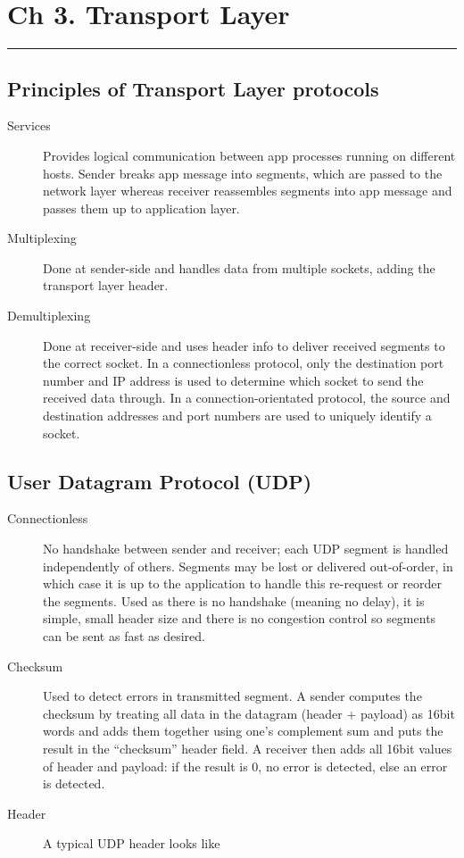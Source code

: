 \documentclass{article}
\begin{document}
\section*{Ch 3. Transport Layer}
\noindent
\rule{\linewidth}{0.5mm}
\noindent

\subsection*{Principles of Transport Layer protocols}

\begin{description}
    \item[Services] Provides logical communication between app processes running on different hosts.
    Sender breaks app message into segments, which are passed to the network layer whereas receiver
    reassembles segments into app message and passes them up to application layer.
    
    \item[Multiplexing] Done at sender-side and handles data from multiple sockets, adding the 
    transport layer header.
    
    \item[Demultiplexing] Done at receiver-side and uses header info to deliver received segments to
    the correct socket. In a connectionless protocol, only the destination port number and IP 
    address is used to determine which socket to send the received data through. In a
    connection-orientated protocol, the source and destination addresses and port numbers are used to
    uniquely identify a socket.
\end{description}

\subsection*{User Datagram Protocol (UDP)}

\begin{description}
    \item[Connectionless] No handshake between sender and receiver; each UDP segment is handled
    independently of others. Segments may be lost or delivered out-of-order, in which case it is up
    to the application to handle this re-request or reorder the segments. Used as there is no handshake
    (meaning no delay), it is simple, small header size and there is no congestion control so segments
    can be sent as fast as desired.
    
    \item[Checksum] Used to detect errors in transmitted segment. A sender computes the checksum by
    treating all data in the datagram (header + payload) as 16bit words and adds them together using
    one's complement sum and puts the result in the ``checksum'' header field. A receiver then adds
    all 16bit values of header and payload: if the result is $0$, no error is detected, else an error
    is detected.
    
    \item[Header] A typical UDP header looks like 
\end{description}
\end{document}
